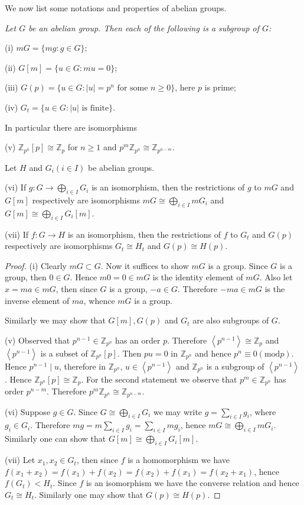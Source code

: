 We now list some notations and properties of abelian groups.
\begin{lemma}\em
Let $G$ be an abelian group. Then each of the following is a subgroup of $G$:\par
(i) $mG=\{mg:g\in G\}$;\par
(ii) $G[m]=\{u\in G:mu=0\}$;\par
(iii) $G(p)=\{u\in G:\text{$|u|=p^n$ for some $n\ge 0$}\}$, here $p$ is prime;\par
(iv) $G_t=\{u\in G:\text{$|u|$ is finite}\}$.\par
In particular there are isomorphisms\par
(v) $\mathbb{Z}_{p^n}[p]\cong\mathbb{Z}_p$ for $n\ge 1$ and $p^m\mathbb{Z}_{p^n}\cong\mathbb{Z}_{p^{n-m}}$.\par
Let $H$ and $G_i(i\in I)$ be abelian groups.\par
(vi) If $g:G\to\bigoplus_{i\in I}G_i$ is an isomorphism, then the restrictions of $g$ to $mG$ and $G[m]$ respectively are isomorphisms $mG\cong\bigoplus_{i\in I}mG_i$ and $G[m]\cong\bigoplus_{i\in I}G_i[m]$.\par
(vii) If $f:G\to H$ is an isomorphism, then the restrictions of $f$ to $G_t$ and $G(p)$ respectively are isomorphisms $G_t\cong H_t$ and $G(p)\cong H(p)$.
\end{lemma}
\begin{proof}
(i) Clearly $mG\subset G$. Now it suffices to show $mG$ is a group. Since $G$ is a group, then $0\in G$. Hence $m0=0\in mG$ is the identity element of $mG$. Also let $x=ma\in mG$, then since $G$ is a group, $-a\in G$. Therefore $-ma\in mG$ is the inverse element of $ma$, whence $mG$ is a group.\par
Similarly we may show that $G[m],G(p)$ and $G_t$ are also subgroups of $G$.\par
(v) Observed that $p^{n-1}\in\mathbb{Z}_{p^n}$ has an order $p$. Therefore $\left<p^{n-1}\right>\cong\mathbb{Z}_p$ and $\left<p^{n-1}\right>$ is a subset of $\mathbb{Z}_{p^n}[p]$. Then $pu=0$ in $\mathbb{Z}_{p^n}$ and hence $p^n\equiv0(\mathrm{mod}p)$. Hence $p^{n-1}\mid u$, therefore in $\mathbb{Z}_{p^n}$, $u\in\left<p^{n-1}\right>$ and $\mathbb{Z}_{p^n}$ is a subgroup of $\left<p^{n-1}\right>$. Hence $\mathbb{Z}_{p^n}[p]\cong\mathbb{Z}_p$. For the second statement we observe that $p^m\in\mathbb{Z}_{p^n}$ has order $p^{n-m}$. Therefore $p^m\mathbb{Z}_{p^n}\cong\mathbb{Z}_{p^{n-m}}$.\par
(vi) Suppose $g\in G$. Since $G\cong\bigoplus_{i\in I}G_i$ we may write $g=\sum_{i\in I}g_i$, where $g_i\in G_i$. Therefore $mg=m\sum_{i\in I}g_i=\sum_{i\in I}mg_i$, hence $mG\cong\bigoplus_{i\in I}mG_i$. Similarly one can show that $G[m]\cong\bigoplus_{i\in I}G_i[m]$.\par
(vii) Let $x_1,x_2\in G_t$, then since $f$ is a homomorphism we have $f(x_1+x_2)=f(x_1)+f(x_2)=f(x_2)+f(x_1)=f(x_2+x_1)$, hence $f(G_t)<H_t$. Since $f$ is an isomorphism we have the converse relation and hence $G_t\cong H_t$. Similarly one may show that $G(p)\cong H(p)$.
\end{proof}
